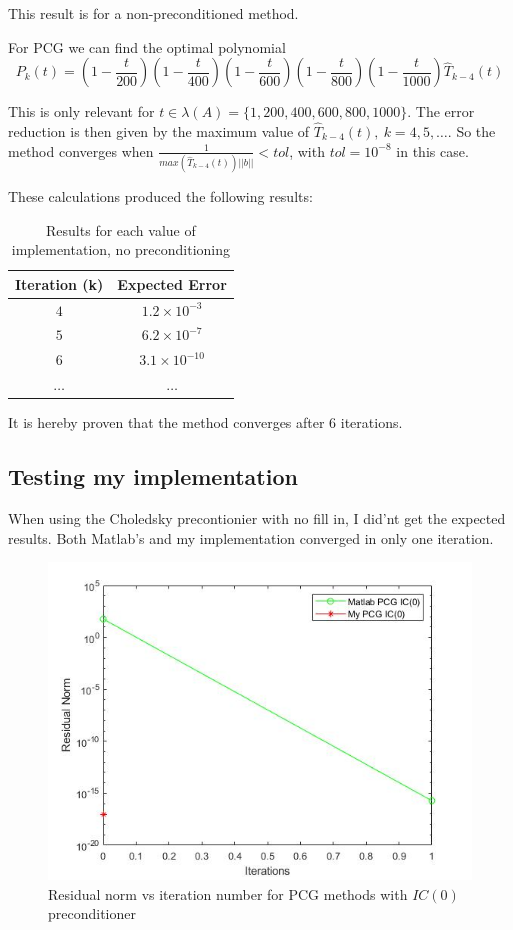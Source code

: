 \documentclass[a4paper, 11pt]{article}
\begin{document}
			This result is for a non-preconditioned method.
			
			For PCG we can find the optimal polynomial
			\begin{equation}
				P_k(t) = \left(1-\frac{t}{200}\right)\left(1-\frac{t}{400}\right)\left(1-\frac{t}{600}\right)\left(1-\frac{t}{800}\right)\left(1-\frac{t}{1000}\right)\hat{T}_{k-4}(t)
			\end{equation}
		
			This is only relevant for $t \in \lambda(A) = \{1,200,400,600,800,1000\}$.
			The error reduction is then given by the maximum value of $ \hat{T}_{k-4}(t),\ k=4,5,\ldots $.
			So the method converges when $\frac{1}{max(\hat{T}_{k-4}(t))||b||} < tol$, with $tol = 10^{-8}$ in this case.
			
			These calculations produced the following results:
			\begin{table}[H]
				\centering
				\begin{tabular}{c|c}
					\textbf{Iteration (k)} 	& \textbf{Expected Error} \\ \hline
					$4$ 					& $ 1.2 \times 10^{-3} $ 	\\ \hline	
					$5$						& $ 6.2 \times 10^{-7} $	\\ \hline
					$6$						& $ 3.1 \times 10^{-10} $	\\	\hline
					$\ldots$				& $ \ldots $	\\
				\end{tabular}
				\caption{Results for each value of implementation, no preconditioning}
				\label{table:ex3_theory}
			\end{table}
		
			It is hereby proven that the method converges after 6 iterations.		
			
			\subsection*{Testing my implementation}
			When using the Choledsky precontionier with no fill in, I did'nt get the expected results.
			Both Matlab's and my implementation converged in only one iteration.
			
			\begin{figure}[H]
				\centering
				\includegraphics[width=.6\linewidth]{ex3.jpg}
				\caption{Residual norm vs iteration number for PCG methods with $IC(0)$ preconditioner}
				\label{fig:ex3}
			\end{figure}
		
\end{document}
